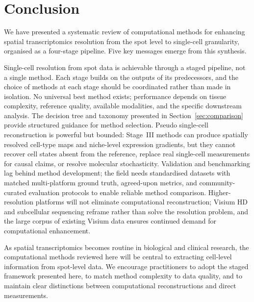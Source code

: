 \section{Conclusion}
\label{sec:conclusion}

We have presented a systematic review of computational methods for enhancing spatial transcriptomics resolution from the spot level to single-cell granularity, organised as a four-stage pipeline. Five key messages emerge from this synthesis.

Single-cell resolution from spot data is achievable through a staged pipeline, not a single method. Each stage builds on the outputs of its predecessors, and the choice of methods at each stage should be coordinated rather than made in isolation. No universal best method exists; performance depends on tissue complexity, reference quality, available modalities, and the specific downstream analysis. The decision tree and taxonomy presented in Section~\ref{sec:comparison} provide structured guidance for method selection. Pseudo single-cell reconstruction is powerful but bounded: Stage~III methods can produce spatially resolved cell-type maps and niche-level expression gradients, but they cannot recover cell states absent from the reference, replace real single-cell measurements for causal claims, or resolve molecular stochasticity. Validation and benchmarking lag behind method development; the field needs standardised datasets with matched multi-platform ground truth, agreed-upon metrics, and community-curated evaluation protocols to enable reliable method comparison. Higher-resolution platforms will not eliminate computational reconstruction; Visium HD and subcellular sequencing reframe rather than solve the resolution problem, and the large corpus of existing Visium data ensures continued demand for computational enhancement.

As spatial transcriptomics becomes routine in biological and clinical research, the computational methods reviewed here will be central to extracting cell-level information from spot-level data. We encourage practitioners to adopt the staged framework presented here, to match method complexity to data quality, and to maintain clear distinctions between computational reconstructions and direct measurements.
